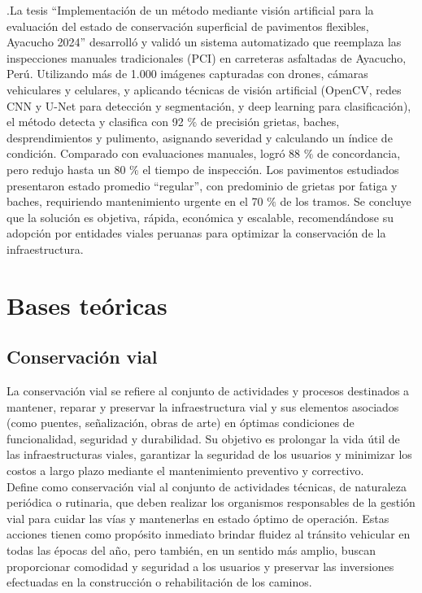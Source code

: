 \noindent \textcite{gastelu2025} .La tesis “Implementación de un método mediante visión artificial para la evaluación del estado de conservación superficial de pavimentos flexibles, Ayacucho 2024” desarrolló y validó un sistema automatizado que reemplaza las inspecciones manuales tradicionales (PCI) en carreteras asfaltadas de Ayacucho, Perú. Utilizando más de 1.000 imágenes capturadas con drones, cámaras vehiculares y celulares, y aplicando técnicas de visión artificial (OpenCV, redes CNN y U-Net para detección y segmentación, y deep learning para clasificación), el método detecta y clasifica con 92 $\%$ de precisión grietas, baches, desprendimientos y pulimento, asignando severidad y calculando un índice de condición. Comparado con evaluaciones manuales, logró 88 $\%$ de concordancia, pero redujo hasta un 80 $\%$ el tiempo de inspección. Los pavimentos estudiados presentaron estado promedio “regular”, con predominio de grietas por fatiga y baches, requiriendo mantenimiento urgente en el 70 $\%$ de los tramos. Se concluye que la solución es objetiva, rápida, económica y escalable, recomendándose su adopción por entidades viales peruanas para optimizar la conservación de la infraestructura.

\section{Bases teóricas}

\subsection{Conservación vial}

La conservación vial se refiere al conjunto de actividades y procesos destinados a mantener, reparar y preservar la infraestructura vial y sus elementos asociados (como puentes, señalización, obras de arte) en óptimas condiciones de funcionalidad, seguridad y durabilidad. Su objetivo es prolongar la vida útil de las infraestructuras viales, garantizar la seguridad de los usuarios y minimizar los costos a largo plazo mediante el mantenimiento preventivo y correctivo.\\
\textcite{Salomon2009} Define como conservación vial al conjunto de actividades técnicas, de naturaleza periódica o rutinaria, que deben realizar los organismos responsables de la gestión vial para cuidar las vías y mantenerlas en estado óptimo de operación. Estas acciones tienen como propósito inmediato brindar fluidez al tránsito vehicular en todas las épocas del año, pero también, en un sentido más amplio, buscan proporcionar comodidad y seguridad a los usuarios y preservar las inversiones efectuadas en la construcción o rehabilitación de los caminos.\\

